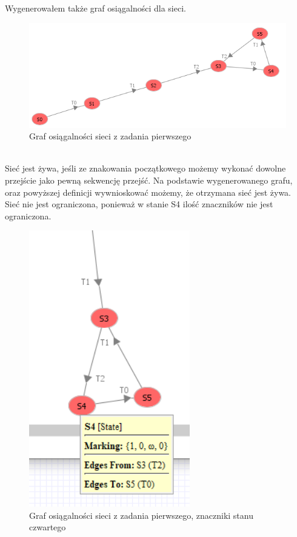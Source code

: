 \documentclass{article}
\begin{document}
        Wygenerowałem także graf osiągalności dla sieci.
        \begin{figure}[h!]
            \centering
            \includegraphics[width=14cm]{lab6/n1_2.png}
            \caption{Graf osiągalności sieci z zadania pierwszego}
        \end{figure}\\
        Sieć jest żywa, jeśli ze znakowania początkowego możemy wykonać dowolne przejście jako pewną sekwencję przejść. Na podstawie wygenerowanego grafu, oraz powyższej definicji wywnioskować możemy, że otrzymana sieć jest żywa. \\
        Sieć nie jest ograniczona, ponieważ w stanie S4 ilość znaczników nie jest ograniczona.
        \begin{figure}[h!]
            \centering
            \includegraphics[width=7cm]{lab6/n1_3.png}
            \caption{Graf osiągalności sieci z zadania pierwszego, znaczniki stanu czwartego}
        \end{figure}\\
\end{document}
